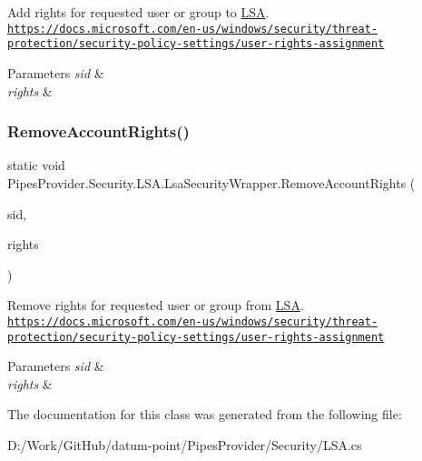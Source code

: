 Add rights for requested user or group to \mbox{\hyperlink{namespace_pipes_provider_1_1_security_1_1_l_s_a}{L\+SA}}. \href{https://docs.microsoft.com/en-us/windows/security/threat-protection/security-policy-settings/user-rights-assignment}{\tt https\+://docs.\+microsoft.\+com/en-\/us/windows/security/threat-\/protection/security-\/policy-\/settings/user-\/rights-\/assignment} 


\begin{DoxyParams}{Parameters}
{\em sid} & \\
\hline
{\em rights} & \\
\hline
\end{DoxyParams}
\mbox{\label{class_pipes_provider_1_1_security_1_1_l_s_a_1_1_lsa_security_wrapper_ad14aaa2cffa5be534590d0ef30810117}} 
\subsubsection{\texorpdfstring{Remove\+Account\+Rights()}{RemoveAccountRights()}}
{\footnotesize\ttfamily static void Pipes\+Provider.\+Security.\+L\+S\+A.\+Lsa\+Security\+Wrapper.\+Remove\+Account\+Rights (\begin{DoxyParamCaption}\item[{Security\+Identifier}]{sid,  }\item[{string}]{rights }\end{DoxyParamCaption})\hspace{0.3cm}{\ttfamily [static]}}



Remove rights for requested user or group from \mbox{\hyperlink{namespace_pipes_provider_1_1_security_1_1_l_s_a}{L\+SA}}. \href{https://docs.microsoft.com/en-us/windows/security/threat-protection/security-policy-settings/user-rights-assignment}{\tt https\+://docs.\+microsoft.\+com/en-\/us/windows/security/threat-\/protection/security-\/policy-\/settings/user-\/rights-\/assignment} 


\begin{DoxyParams}{Parameters}
{\em sid} & \\
\hline
{\em rights} & \\
\hline
\end{DoxyParams}


The documentation for this class was generated from the following file\+:\begin{DoxyCompactItemize}
\item 
D\+:/\+Work/\+Git\+Hub/datum-\/point/\+Pipes\+Provider/\+Security/L\+S\+A.\+cs\end{DoxyCompactItemize}
